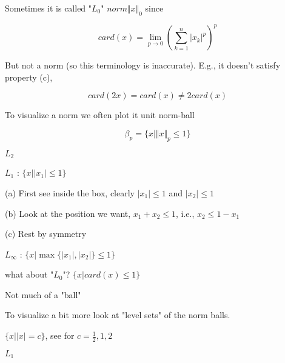 Sometimes it is called "$L_{0}$" $norm \Vert x\Vert_{0}$ since

$$card(x)=\lim_{p\to 0}(\sum_{k=1}^{n}\vert x_{k}\vert^{p})^{p}$$

But not a norm (so this terminology is inaccurate). E.g., it doesn't satisfy property (c),

$$card(2x)=card(x)\neq 2card(x)$$


To visualize a norm we often plot it unit norm-ball

$$\beta_{p}=\{x|\Vert x\Vert_{p}\leq 1\}$$

$L_{2}$

\begin{marginfigure}
	\centering
	\resizebox{7.5cm}{3cm}{}
	\caption{}
	\label{}
\end{marginfigure}

$L_{1}$ : $\{x|\vert x_{1}\vert\leq 1\}$

\begin{marginfigure}
	\centering
	\resizebox{7.5cm}{3cm}{}
	\caption{}
	\label{}
\end{marginfigure}

(a) First see inside the box, clearly $\vert x_{1}\vert\leq 1$ and $\vert x_{2}\vert\leq 1$

(b) Look at the position we want, $x_{1}+x_{2}\leq 1$, i.e., $x_{2}\leq 1-x_{1}$

(c) Rest by symmetry


$L_{\infty}$ : $\{x|\max\{\vert x_{1}\vert, \vert x_{2}\vert\} \leq 1\}$

\begin{marginfigure}
	\centering
	\resizebox{7.5cm}{3cm}{}
	\caption{}
	\label{}
\end{marginfigure}


what about "$L_{0}$"? $\{x|card(x)\leq 1\}$

\begin{figure}
	\centering
	\resizebox{7.5cm}{3cm}{}
	\caption{}
	\label{}
\end{figure}

Not much of a "ball"


To visualize a bit more look at "level sets" of the norm balls.

$\{x|\vert x\vert=c \}$, see for $c=\frac{1}{2}, 1, 2$

$L_{1}$

\begin{marginfigure}
	\centering
	\resizebox{7.5cm}{3cm}{}
	\caption{}
	\label{}
\end{marginfigure}


